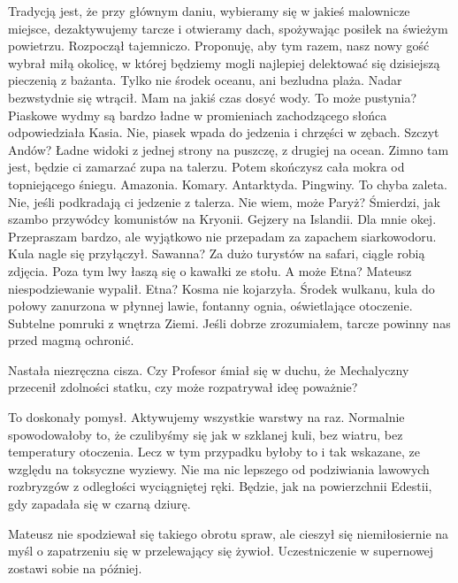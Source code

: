 \begin{dialogue}
\ds{} Tradycją jest, że przy głównym daniu, wybieramy się w jakieś malownicze miejsce, dezaktywujemy tarcze i otwieramy dach, spożywając posiłek na świeżym powietrzu. \dm{}
Rozpoczął tajemniczo. \dm{} Proponuję, aby tym razem, nasz nowy gość wybrał miłą okolicę, w której będziemy mogli najlepiej delektować się dzisiejszą pieczenią z bażanta.
\ds{} Tylko nie środek oceanu, ani bezludna plaża. \dm{} Nadar bezwstydnie się wtrącił. \dm{} Mam na jakiś czas dosyć wody. 
\ds{} To może pustynia? Piaskowe wydmy są bardzo ładne w promieniach zachodzącego słońca \dm{} odpowiedziała Kasia. \de{}
\ds{} Nie, piasek wpada do jedzenia i chrzęści w zębach.
\ds{} Szczyt Andów? Ładne widoki z jednej strony na puszczę, z drugiej na ocean.
\ds{} Zimno tam jest, będzie ci zamarzać zupa na talerzu. Potem skończysz cała mokra od topniejącego śniegu.
\ds{} Amazonia.
\ds{} Komary.
\ds{} Antarktyda.
\ds{} Pingwiny.
\ds{} To chyba zaleta.
\ds{} Nie, jeśli podkradają ci jedzenie z talerza.
\ds{} Nie wiem, może Paryż?
\ds{} Śmierdzi, jak szambo przywódcy komunistów na Kryonii.
\ds{} Gejzery na Islandii.
\ds{} Dla mnie okej.
\ds{} Przepraszam bardzo, ale wyjątkowo nie przepadam za zapachem siarkowodoru. \dm{} Kula nagle się przyłączył.
\ds{} Sawanna?
\ds{} Za dużo turystów na safari, ciągle robią zdjęcia. Poza tym lwy łaszą się o kawałki ze stołu.
\ds{} A może Etna? \dm{} Mateusz niespodziewanie wypalił.
\ds{} Etna? \dm{} Kosma nie kojarzyła.
\ds{} Środek wulkanu, kula do połowy zanurzona w płynnej lawie, fontanny ognia, oświetlające otoczenie. Subtelne pomruki z wnętrza Ziemi.
Jeśli dobrze zrozumiałem, tarcze powinny nas przed magmą ochronić.
\end{dialogue}

Nastała niezręczna cisza. Czy Profesor śmiał się w duchu, że Mechalyczny przecenił zdolności statku, czy może rozpatrywał ideę poważnie?

\begin{dialogue}
\ds{} To doskonały pomysł. Aktywujemy wszystkie warstwy na raz. Normalnie spowodowałoby to, że czulibyśmy się 
jak w szklanej kuli, bez wiatru, bez temperatury otoczenia. Lecz w tym przypadku byłoby to i tak wskazane, ze względu na toksyczne wyziewy.
Nie ma nic lepszego od podziwiania lawowych rozbryzgów z odległości wyciągniętej ręki. Będzie, jak na powierzchnii Edestii, gdy zapadała się w czarną dziurę.
\end{dialogue}

Mateusz nie spodziewał się takiego obrotu spraw, ale cieszył się niemiłosiernie na myśl o zapatrzeniu się w przelewający się żywioł.
Uczestniczenie w supernowej zostawi sobie na później.

